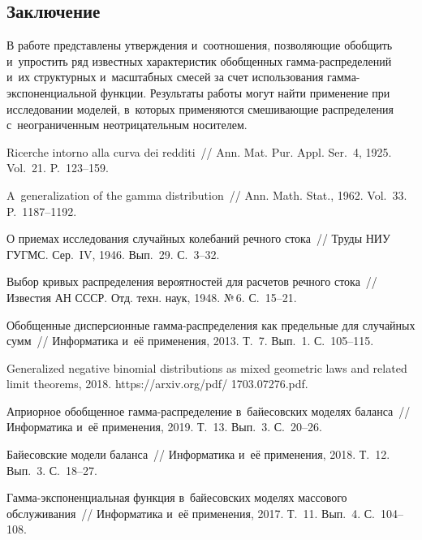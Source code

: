 \begin{multicols}{2}
\section{Заключение}

В работе представлены утверждения и~соотношения, позволяющие обобщить 
и~упростить ряд известных характеристик обобщенных гам\-ма-рас\-пре\-де\-ле\-ний и~их 
структурных и~масштабных смесей за счет использования гам\-ма-экс\-по\-нен\-ци\-аль\-ной 
функции. Результаты работы могут найти применение при исследовании моделей, 
в~которых применяются смешивающие распределения с~неограниченным неотрицательным 
носителем.

{\small\frenchspacing
 {%
 \begin{thebibliography}{99}
Ricerche intorno alla curva dei redditi~// 
Ann. Mat. Pur. Appl. Ser.~4, 1925. Vol.~21. P.~123--159.

A~generalization of the gamma distribution~// 
Ann. Math. Stat., 1962. Vol.~33. P.~1187--1192.

О приемах исследования случайных колебаний речного стока~// 
Труды НИУ ГУГМС. Сер.~IV, 1946. Вып.~29. С.~3--32.

Выбор кривых распределения вероятностей для расчетов речного стока~// 
Известия АН СССР. Отд. техн. наук, 1948. №\,6. С.~15--21.

Обобщенные дисперсионные гам\-ма-рас\-пре\-де\-ле\-ния как предельные для случайных сумм~// 
Информатика и~её применения, 2013. Т.~7. Вып.~1. С.~105--115.

Generalized negative binomial distributions as mixed geometric laws and related 
limit theorems, 2018.
{\sf https://arxiv.org/pdf/ 1703.07276.pdf}.

Априорное обобщенное гам\-ма-рас\-пре\-де\-ле\-ние в~байесовских моделях баланса~// 
Информатика и~её применения, 2019. Т.~13. Вып.~3. С.~20--26.

Байесовские модели баланса~// Информатика и~её применения, 2018. Т.~12. Вып.~3. С.~18--27.

Гамма-экс\-по\-нен\-ци\-аль\-ная функция в~байесовских моделях массового обслуживания~// 
Информатика и~её применения, 2017. Т.~11. Вып.~4. С.~104--108.


\end{thebibliography}}}
\end{multicols}
